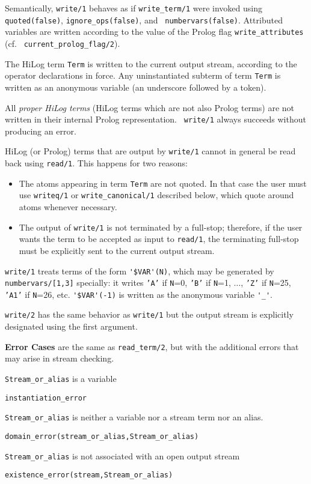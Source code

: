 \begin{description}
% 
Semantically, {\tt write/1} behaves as if {\tt write\_term/1} were
invoked using {\tt quoted(false)}, {\tt ignore\_ops(false)}, and {\tt
  numbervars(false)}.  Attributed variables are written according to
the value of the Prolog flag {\tt write\_attributes} (cf. {\tt
  current\_prolog\_flag/2}).

The HiLog term {\tt Term} is written to the current output stream,
according to the operator declarations in force.  Any uninstantiated
subterm of term {\tt Term} is written as an anonymous variable (an
underscore followed by a token).  

All {\em proper HiLog terms} (HiLog terms which are not also Prolog
terms) are not written in their internal Prolog representation.  {\tt
  write/1} always succeeds without producing an error.

HiLog (or Prolog) terms that are output by {\tt write/1} cannot in
general be read back using {\tt read/1}.  This happens for two
reasons:
    \begin{itemize}
    \item The atoms appearing in term {\tt Term} are not quoted. In that case 
          the user must use {\tt writeq/1} or 
          {\tt write\_canonical/1} described below, which quote around atoms 
          whenever necessary.
    \item The output of {\tt write/1} is not terminated by a full-stop;
          therefore, if the user wants the term to be accepted as input to
          {\tt read/1}, the terminating full-stop must be explicitly sent 
          to the current output stream. 
    \end{itemize}

{\tt write/1} treats terms of the form \verb|'$VAR'(N)|, which may be
generated by {\tt numbervars/[1,3]} specially: it writes {\tt 'A'} if
{\tt N}=0, {\tt 'B'} if {\tt N}=1, $\ldots$, {\tt 'Z'} if {\tt N}=25,
{\tt 'A1'} if {\tt N}=26, etc.  \verb|'$VAR'(-1)| is written as the
anonymous variable \verb|'_'|.

	{\tt write/2} has the same behavior as {\tt write/1} but the
	output stream is explicitly designated using the first argument.

{\bf Error Cases} are the same as {\tt read\_term/2}, but with the
additional errors that may arise in stream checking.
\bi
\item 	{\tt Stream\_or\_alias} is a variable
\bi
\item {\tt instantiation\_error}
\ei
\item 	{\tt Stream\_or\_alias} is neither a variable nor a stream term nor an alias.
\bi
\item 	{\tt domain\_error(stream\_or\_alias,Stream\_or\_alias)}
\ei
\item 	{\tt Stream\_or\_alias} is not associated with an open output stream
\bi
\item 	{\tt existence\_error(stream,Stream\_or\_alias)}
\ei
\ei


\end{description}
